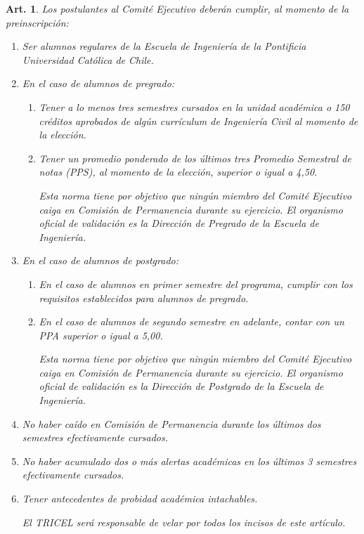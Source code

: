 \documentclass[letterpaper,11pt]{article}
\theoremstyle{plain}
\newtheorem{art}{Art.} %
\begin{document}
		\begin{art}\label{requisitosEjecutivo}
			Los postulantes al Comité Ejecutivo deberán cumplir, al momento de la preinscripción:
			\begin{enumerate}
				\item Ser alumnos regulares de la Escuela de Ingeniería de la Pontificia Universidad Católica de Chile.
				\item En el caso de alumnos de pregrado:
					\begin{enumerate}
						\item Tener a lo menos tres semestres cursados en la unidad académica o 150 créditos aprobados de algún currículum de Ingeniería Civil al momento de la elección.
						
						\item Tener un promedio ponderado de los últimos tres Promedio Semestral de notas (PPS), al momento de la elección, superior o igual a 4,50.

						Esta norma tiene por objetivo que ningún miembro del Comité Ejecutivo caiga en Comisión de Permanencia durante su ejercicio. El organismo oficial de validación es la Dirección de Pregrado de la Escuela de Ingeniería.
					\end{enumerate}
				\item En el caso de alumnos de postgrado:
					\begin{enumerate}
						\item En el caso de alumnos en primer semestre del programa, cumplir con los requisitos establecidos para alumnos de pregrado.
						\item En el caso de alumnos de segundo semestre en adelante, contar con un PPA superior o igual a 5,00.

						Esta norma tiene por objetivo que ningún miembro del Comité Ejecutivo caiga en Comisión de Permanencia durante su ejercicio. El organismo oficial de validación es la Dirección de Postgrado de la Escuela de Ingeniería.
					\end{enumerate}

				\item No haber caído en Comisión de Permanencia durante los últimos dos semestres efectivamente cursados.

				\item No haber acumulado dos o más alertas académicas en los últimos 3 semestres efectivamente cursados.
				
				\item Tener antecedentes de probidad académica intachables. 

				El TRICEL será responsable de velar por todos los incisos de este artículo.
			\end{enumerate}
		\end{art}
\end{document}
